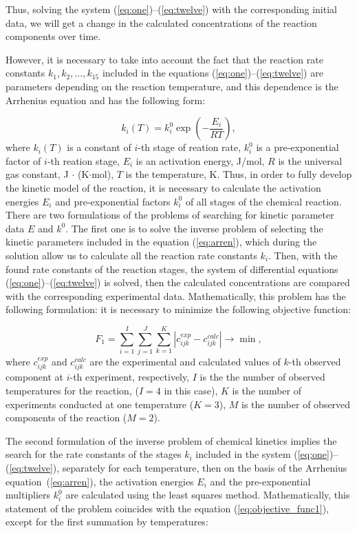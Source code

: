 \documentclass{svproc}
\begin{document}
Thus, solving the system (\ref{eq:one})--(\ref{eq:twelve}) with the corresponding initial data, we will get a change in the calculated concentrations of the reaction components over time.

However, it is necessary to take into account the fact that the reaction rate constants $k_1, k_2, ..., k_{15}$ included in the equations (\ref{eq:one})--(\ref{eq:twelve}) are parameters depending on the reaction temperature, and this dependence is the Arrhenius equation and has the following form:

\begin{equation}
  k_i (T) = k_i^0 \exp \left(- \dfrac{E_i}{RT} \right),
  \label{eq:arren}
\end{equation}
where $k_i(T)$ is a constant of $i$-th stage of reation rate, $k_i^0$ is a pre-exponential factor of $i$-th reation stage, $E_i$ is an activation energy, J/mol, $R$ is the universal gas constant, J $\cdot$ (K$\cdot$mol), $T$ is the temperature, K. Thus, in order to fully develop the kinetic model of the reaction, it is necessary to calculate the activation energies $E_i$ and pre-exponential factors $k_i^0$ of all stages of the chemical reaction.  There are two formulations of the problems of searching for kinetic parameter data $E$ and $k^0$. The first one is to solve the inverse problem of selecting the kinetic parameters included in the equation (\ref{eq:arren}), which during the solution allow us to calculate all the reaction rate constants $k_i$. Then, with the found rate constants of the reaction stages, the system of differential equations (\ref{eq:one})--(\ref{eq:twelve}) is solved, then the calculated concentrations are compared with the corresponding experimental data. Mathematically, this problem has the following formulation: it is necessary to minimize the following objective function:

\begin{equation}
  F_1 = \sum_{i=1}^I \sum_{j=1}^J \sum_{k=1}^K \left| c_{ijk}^{exp} - c_{ijk}^{calc} \right| \longrightarrow \min,
  \label{eq:objective_func1}
\end{equation}
where $c_{ijk}^{exp}$ and $c_{ijk}^{calc}$ are the experimental and calculated values of $k$-th observed component at $i$-th experiment, respectively, $I$ is the the number of observed temperatures for the reaction, ($I = 4$ in this case), $K$ is the number of experiments conducted at one temperature ($K = 3$), $M$ is the number of observed components of the reaction ($M = 2$).

The second formulation of the inverse problem of chemical kinetics implies the search for the rate constants of the stages $k_i$ included in the system (\ref{eq:one})--(\ref{eq:twelve}), separately for each temperature, then on the basis of the Arrhenius equation~(\ref{eq:arren}), the activation energies $E_i$ and the pre-exponential multipliers $k_i^0$ are calculated using the least squares method. Mathematically, this statement of the problem coincides with the equation (\ref{eq:objective_func1}), except for the first summation by temperatures:
\end{document}
